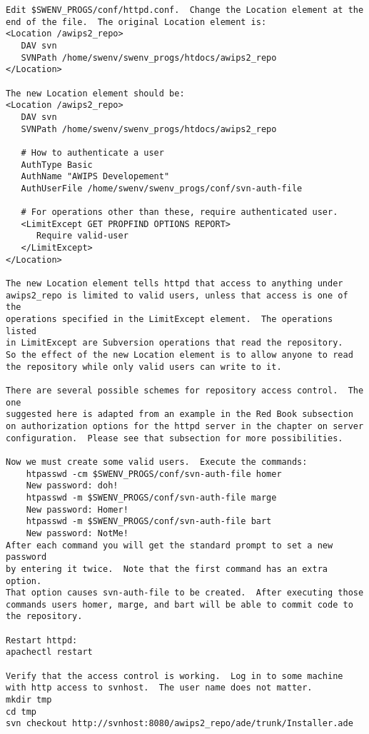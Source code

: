 \begin{verbatim}
Edit $SWENV_PROGS/conf/httpd.conf.  Change the Location element at the 
end of the file.  The original Location element is:
<Location /awips2_repo>
   DAV svn
   SVNPath /home/swenv/swenv_progs/htdocs/awips2_repo
</Location>

The new Location element should be:
<Location /awips2_repo>
   DAV svn
   SVNPath /home/swenv/swenv_progs/htdocs/awips2_repo
  
   # How to authenticate a user
   AuthType Basic
   AuthName "AWIPS Developement"
   AuthUserFile /home/swenv/swenv_progs/conf/svn-auth-file

   # For operations other than these, require authenticated user.
   <LimitExcept GET PROPFIND OPTIONS REPORT>
      Require valid-user
   </LimitExcept>
</Location>

The new Location element tells httpd that access to anything under
awips2_repo is limited to valid users, unless that access is one of the
operations specified in the LimitExcept element.  The operations listed
in LimitExcept are Subversion operations that read the repository.
So the effect of the new Location element is to allow anyone to read
the repository while only valid users can write to it.

There are several possible schemes for repository access control.  The one
suggested here is adapted from an example in the Red Book subsection
on authorization options for the httpd server in the chapter on server
configuration.  Please see that subsection for more possibilities.

Now we must create some valid users.  Execute the commands:
    htpasswd -cm $SWENV_PROGS/conf/svn-auth-file homer
    New password: doh!
    htpasswd -m $SWENV_PROGS/conf/svn-auth-file marge
    New password: Homer!
    htpasswd -m $SWENV_PROGS/conf/svn-auth-file bart
    New password: NotMe!
After each command you will get the standard prompt to set a new password
by entering it twice.  Note that the first command has an extra option.
That option causes svn-auth-file to be created.  After executing those
commands users homer, marge, and bart will be able to commit code to
the repository.

Restart httpd:
apachectl restart

Verify that the access control is working.  Log in to some machine
with http access to svnhost.  The user name does not matter.
mkdir tmp
cd tmp
svn checkout http://svnhost:8080/awips2_repo/ade/trunk/Installer.ade


\end{verbatim}
